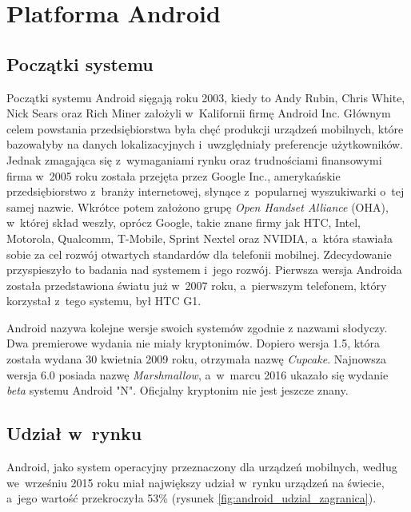 \chapter{Platforma Android}

\section{Początki systemu}
Początki systemu Android sięgają roku 2003, kiedy to Andy Rubin, Chris White, Nick Sears oraz Rich Miner założyli w~Kalifornii firmę Android Inc. Głównym celem powstania przedsiębiorstwa była chęć produkcji urządzeń mobilnych, które bazowałyby na danych lokalizacyjnych i~uwzględniały preferencje użytkowników. Jednak zmagająca się z~wymaganiami rynku oraz trudnościami finansowymi firma w~2005 roku została przejęta przez Google Inc., amerykańskie przedsiębiorstwo z~branży internetowej, słynące z~popularnej wyszukiwarki o~tej samej nazwie. Wkrótce potem założono grupę \textit{Open Handset Alliance} (OHA), w~której skład weszły, oprócz Google, takie znane firmy jak HTC, Intel, Motorola, Qualcomm, T-Mobile, Sprint Nextel oraz NVIDIA, a~która stawiała sobie za cel rozwój otwartych standardów dla telefonii mobilnej. Zdecydowanie przyspieszyło to badania nad systemem i~jego rozwój. Pierwsza wersja Androida została przedstawiona światu już w~2007 roku, a~pierwszym telefonem, który korzystał z~tego systemu, był HTC G1.

Android nazywa kolejne wersje swoich systemów zgodnie z nazwami słodyczy. Dwa premierowe wydania nie miały kryptonimów. Dopiero wersja 1.5, która została wydana 30 kwietnia 2009 roku, otrzymała nazwę \textit{Cupcake}. Najnowsza wersja 6.0 posiada nazwę \textit{Marshmallow}, a~w~marcu 2016 ukazało się wydanie \textit{beta} systemu Android "N". Oficjalny kryptonim nie jest jeszcze znany.

\section{Udział w~rynku}
Android, jako system operacyjny przeznaczony dla urządzeń mobilnych, według \cite{website:android:stat2} we~wrześniu 2015 roku miał największy udział w~rynku urządzeń na świecie, a~jego wartość przekroczyła 53\% (rysunek \ref{fig:android_udzial_zagranica}).

